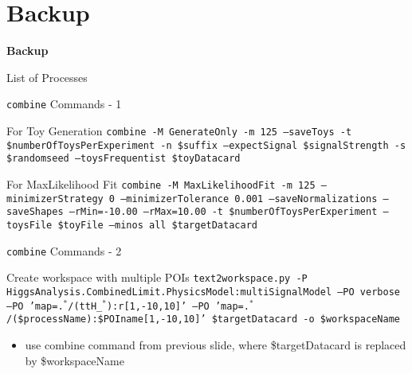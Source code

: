 \section*{Backup}
\begin{frame}
	\begin{center}
		\textbf{\Huge Backup}
	\end{center}
\end{frame}

\begin{frame}{List of Processes}


\end{frame}


\begin{frame}{\texttt{combine} Commands - 1}
\begin{block}{For Toy Generation}
\texttt{combine -M GenerateOnly -m 125 --saveToys -t \$numberOfToysPerExperiment -n \$suffix --expectSignal \$signalStrength -s \$randomseed --toysFrequentist \$toyDatacard}
\end{block}
\begin{block}{For MaxLikelihood Fit}
\texttt{combine -M MaxLikelihoodFit -m 125 --minimizerStrategy 0 --minimizerTolerance 0.001 --saveNormalizations --saveShapes --rMin=-10.00 --rMax=10.00 -t \$numberOfToysPerExperiment --toysFile \$toyFile --minos all \$targetDatacard}
\end{block}

\end{frame}

\begin{frame}{\texttt{combine} Commands - 2}
\begin{block}{Create workspace with multiple POIs}
\texttt{text2workspace.py -P HiggsAnalysis.CombinedLimit.PhysicsModel:multiSignalModel --PO verbose  --PO 'map=.$^*$/(ttH\_$^*$):r[1,-10,10]' --PO 'map=.$^*$/(\$processName):\$POIname[1,-10,10]' \$targetDatacard -o \$workspaceName}
\end{block}
\begin{itemize}
\item use combine command from previous slide, where \$targetDatacard is replaced by \$workspaceName
\end{itemize}
\end{frame}

